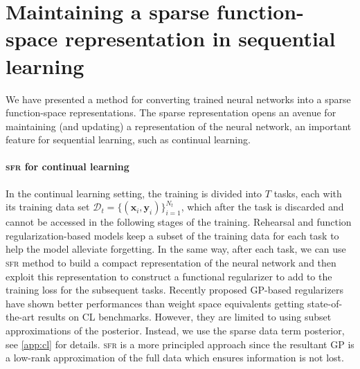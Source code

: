 \documentclass{article} %
\newcommand{\our}{\textsc{sfr}\xspace}
\newcommand{\dataset}{\ensuremath{\mathcal{D}}}
\begin{document}
\section{Maintaining a sparse function-space representation in sequential learning}
\label{sec:sequential}
%
We have presented a method for converting trained neural networks into a sparse function-space representations. The sparse representation opens an avenue for maintaining (and updating) a representation of the neural network, an important feature for sequential learning, such as continual learning.



\paragraph{\our for continual learning}
In the continual learning setting, the training is divided into $T$ tasks, each with its training data set $\dataset_t = \{(\mathbf{x}_{i}, \mathbf{y}_{i})\}_{i=1}^{N_t}$, which after the task is discarded and cannot be accessed in the following stages of the training. Rehearsal and function regularization-based models keep a subset of the training data for each task to help the model alleviate forgetting. In the same way, after each task, we can use \our method to build a compact representation of the neural network and then exploit this representation to construct a functional regularizer to add to the training loss for the subsequent tasks. Recently proposed GP-based regularizers \cite{ pan2020continual, rudner2022continual} have shown better performances than weight space equivalents getting state-of-the-art results on CL benchmarks. However, they are limited to using subset approximations of the posterior. Instead, we use the sparse data term posterior, see \cref{app:cl} for details.
\our is a more principled approach since the resultant GP is a low-rank approximation of the full data which ensures information is not lost. %
\end{document}
